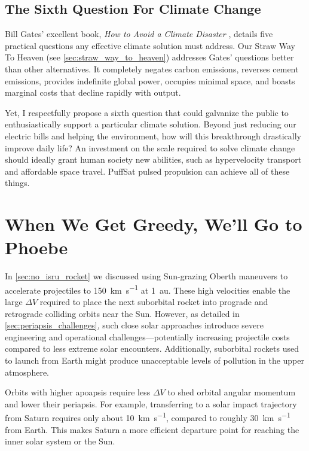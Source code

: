 \documentclass{article}
\begin{document}
\subsection{The Sixth Question For Climate Change}\label{sec:sith_question}
Bill Gates' excellent book, \textit{How to Avoid a Climate Disaster} \cite{gates2021avoid}, details five practical questions \cite{breakthroughenergy_2021_five} any effective climate solution must address. Our Straw Way To Heaven (see \autoref{sec:straw_way_to_heaven}) addresses Gates' questions better than other alternatives. It completely negates carbon emissions, reverses cement emissions, provides indefinite global power, occupies minimal space, and boasts marginal costs that decline rapidly with output.

Yet, I respectfully propose a sixth question that could galvanize the public to enthusiastically support a particular climate solution. Beyond just reducing our electric bills and helping the environment, how will this breakthrough drastically improve daily life? An investment on the scale required to solve climate change should ideally grant human society new abilities, such as hypervelocity transport and affordable space travel. PuffSat pulsed propulsion can achieve all of these things.  

\section{When We Get Greedy, We'll Go to Phoebe}\label{sec:greedy_phoebe}
In \autoref{sec:no_isru_rocket} we discussed using Sun-grazing Oberth maneuvers to accelerate projectiles to \SI{150}{\kilo\meter\per\second} at \SI{1}{\astronomicalunit}. These high velocities enable the large $\Delta V$ required to place the next suborbital rocket into prograde and retrograde colliding orbits near the Sun.  However, as detailed in \autoref{sec:periapsis_challenges}, such close solar approaches introduce severe engineering and operational challenges---potentially increasing projectile costs compared to less extreme solar encounters.  Additionally, suborbital rockets used to launch from Earth might produce unacceptable levels of pollution in the upper atmosphere.

Orbits with higher apoapsis require less $\Delta V$ to shed orbital angular momentum and lower their periapsis. For example, transferring to a solar impact trajectory from Saturn requires only about \SI{10}{\kilo\meter\per\second}, compared to roughly \SI{30}{\kilo\meter\per\second} from Earth. This makes Saturn a more efficient departure point for reaching the inner solar system or the Sun.
\end{document}

